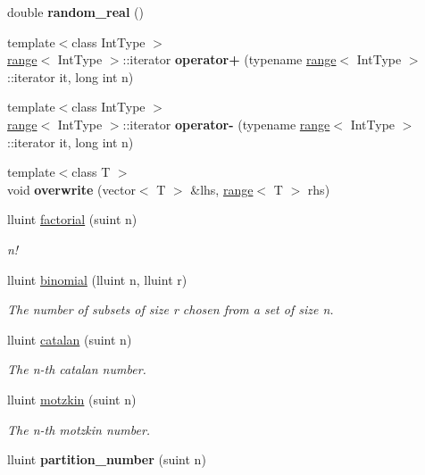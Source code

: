 \begin{DoxyCompactItemize}
\item 
\hypertarget{namespacedscr_a6d213450a8792dd5a5cec9f0ea719c81}{double {\bfseries random\-\_\-real} ()}\label{namespacedscr_a6d213450a8792dd5a5cec9f0ea719c81}

\item 
\hypertarget{namespacedscr_a6c80df2cf9f85293d56c53822ae5d320}{{\footnotesize template$<$class Int\-Type $>$ }\\\hyperlink{classdscr_1_1range}{range}$<$ Int\-Type $>$\-::iterator {\bfseries operator+} (typename \hyperlink{classdscr_1_1range}{range}$<$ Int\-Type $>$\-::iterator it, long int n)}\label{namespacedscr_a6c80df2cf9f85293d56c53822ae5d320}

\item 
\hypertarget{namespacedscr_a0a852f8cf5bdda064cf23ff9b9465fd0}{{\footnotesize template$<$class Int\-Type $>$ }\\\hyperlink{classdscr_1_1range}{range}$<$ Int\-Type $>$\-::iterator {\bfseries operator-\/} (typename \hyperlink{classdscr_1_1range}{range}$<$ Int\-Type $>$\-::iterator it, long int n)}\label{namespacedscr_a0a852f8cf5bdda064cf23ff9b9465fd0}

\item 
\hypertarget{namespacedscr_add7fdb91f0c50ffff676219b2d94334f}{{\footnotesize template$<$class T $>$ }\\void {\bfseries overwrite} (vector$<$ T $>$ \&lhs, \hyperlink{classdscr_1_1range}{range}$<$ T $>$ rhs)}\label{namespacedscr_add7fdb91f0c50ffff676219b2d94334f}

\item 
lluint \hyperlink{namespacedscr_a496c3779c8c144b2fe598ab20373dc0b}{factorial} (suint n)
\begin{DoxyCompactList}\small\item\em n! \end{DoxyCompactList}\item 
lluint \hyperlink{namespacedscr_ab4cfc6d9fefa7536fc8914cf6f5e8236}{binomial} (lluint n, lluint r)
\begin{DoxyCompactList}\small\item\em The number of subsets of size r chosen from a set of size n. \end{DoxyCompactList}\item 
lluint \hyperlink{namespacedscr_a7f5a46c1492a9c8bebc8baccd41dac92}{catalan} (suint n)
\begin{DoxyCompactList}\small\item\em The n-\/th catalan number. \end{DoxyCompactList}\item 
lluint \hyperlink{namespacedscr_aad6881d978007dd2cb0a65d5cbc9f132}{motzkin} (suint n)
\begin{DoxyCompactList}\small\item\em The n-\/th motzkin number. \end{DoxyCompactList}\item 
\hypertarget{namespacedscr_a8f54dc0a97fb10ec22ee3d3531654072}{lluint {\bfseries partition\-\_\-number} (suint n)}\label{namespacedscr_a8f54dc0a97fb10ec22ee3d3531654072}


\end{DoxyCompactItemize}
